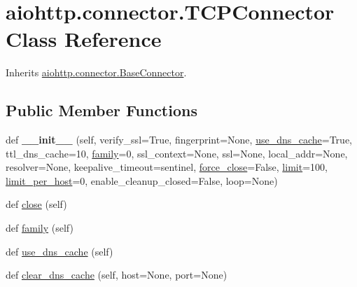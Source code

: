 \hypertarget{classaiohttp_1_1connector_1_1_t_c_p_connector}{}\section{aiohttp.\+connector.\+T\+C\+P\+Connector Class Reference}
\label{classaiohttp_1_1connector_1_1_t_c_p_connector}


Inherits \hyperlink{classaiohttp_1_1connector_1_1_base_connector}{aiohttp.\+connector.\+Base\+Connector}.

\subsection*{Public Member Functions}
\begin{DoxyCompactItemize}
\item 
\mbox{\label{classaiohttp_1_1connector_1_1_t_c_p_connector_a728919a67c374cb846880c373981f782}} 
def {\bfseries \+\_\+\+\_\+init\+\_\+\+\_\+} (self, verify\+\_\+ssl=True, fingerprint=None, \hyperlink{classaiohttp_1_1connector_1_1_t_c_p_connector_ad7545e97c1f19791da78c482a1951a6c}{use\+\_\+dns\+\_\+cache}=True, ttl\+\_\+dns\+\_\+cache=10, \hyperlink{classaiohttp_1_1connector_1_1_t_c_p_connector_a4338fc5b4c915936481d0518eeb6a9dd}{family}=0, ssl\+\_\+context=None, ssl=None, local\+\_\+addr=None, resolver=None, keepalive\+\_\+timeout=sentinel, \hyperlink{classaiohttp_1_1connector_1_1_base_connector_ae732f0e680ae1c5d35c57417a5cd9c4e}{force\+\_\+close}=False, \hyperlink{classaiohttp_1_1connector_1_1_base_connector_a9ae454fca119e032ccf66cb4745f4fbe}{limit}=100, \hyperlink{classaiohttp_1_1connector_1_1_base_connector_adce24e0088f2017dcc7338b65a708f04}{limit\+\_\+per\+\_\+host}=0, enable\+\_\+cleanup\+\_\+closed=False, loop=None)
\item 
def \hyperlink{classaiohttp_1_1connector_1_1_t_c_p_connector_aa7be1d5969240c4472de23253de2b9af}{close} (self)
\item 
def \hyperlink{classaiohttp_1_1connector_1_1_t_c_p_connector_a4338fc5b4c915936481d0518eeb6a9dd}{family} (self)
\item 
def \hyperlink{classaiohttp_1_1connector_1_1_t_c_p_connector_ad7545e97c1f19791da78c482a1951a6c}{use\+\_\+dns\+\_\+cache} (self)
\item 
def \hyperlink{classaiohttp_1_1connector_1_1_t_c_p_connector_a2c456259aee8271a66271e092919f179}{clear\+\_\+dns\+\_\+cache} (self, host=None, port=None)
\end{DoxyCompactItemize}
